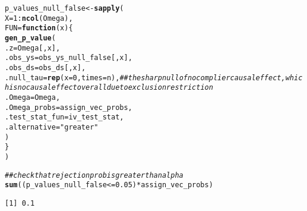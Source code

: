 \documentclass[11pt,leqno]{article}\usepackage[]{graphicx}\usepackage[]{color}
\makeatletter
\newcommand{\hlnum}[1]{\textcolor[rgb]{0.686,0.059,0.569}{#1}}%
\newcommand{\hlstr}[1]{\textcolor[rgb]{0.192,0.494,0.8}{#1}}%
\newcommand{\hlcom}[1]{\textcolor[rgb]{0.678,0.584,0.686}{\textit{#1}}}%
\newcommand{\hlopt}[1]{\textcolor[rgb]{0,0,0}{#1}}%
\newcommand{\hlstd}[1]{\textcolor[rgb]{0.345,0.345,0.345}{#1}}%
\newcommand{\hlkwa}[1]{\textcolor[rgb]{0.161,0.373,0.58}{\textbf{#1}}}%
\newcommand{\hlkwb}[1]{\textcolor[rgb]{0.69,0.353,0.396}{#1}}%
\newcommand{\hlkwc}[1]{\textcolor[rgb]{0.333,0.667,0.333}{#1}}%
\newcommand{\hlkwd}[1]{\textcolor[rgb]{0.737,0.353,0.396}{\textbf{#1}}}%
\newenvironment{kframe}{%
 \def\at@end@of@kframe{}%
 \ifinner\ifhmode%
  \def\at@end@of@kframe{\end{minipage}}%
  \begin{minipage}{\columnwidth}%
 \fi\fi%
 \def\FrameCommand##1{\hskip\@totalleftmargin \hskip-\fboxsep
 \colorbox{shadecolor}{##1}\hskip-\fboxsep
     \hskip-\linewidth \hskip-\@totalleftmargin \hskip\columnwidth}%
 \MakeFramed {\advance\hsize-\width
   \@totalleftmargin\z@ \linewidth\hsize
   \@setminipage}}%
 {\par\unskip\endMakeFramed%
 \at@end@of@kframe}
\newenvironment{knitrout}{}{} %
\theoremstyle{newstyle}
\makeatother
\begin{document}
\begin{knitrout}
\begin{kframe}
\begin{alltt}
\hlstd{p_values_null_false} \hlkwb{<-} \hlkwd{sapply}\hlstd{(}
  \hlkwc{X} \hlstd{=} \hlnum{1}\hlopt{:}\hlkwd{ncol}\hlstd{(Omega),}
  \hlkwc{FUN} \hlstd{=} \hlkwa{function}\hlstd{(}\hlkwc{x}\hlstd{) \{}
    \hlkwd{gen_p_value}\hlstd{(}
      \hlkwc{.z} \hlstd{= Omega[, x],}
      \hlkwc{.obs_ys} \hlstd{= obs_ys_null_false[, x],}
      \hlkwc{.obs_ds} \hlstd{= obs_ds[, x],}
      \hlkwc{.null_tau} \hlstd{=} \hlkwd{rep}\hlstd{(}\hlkwc{x} \hlstd{=} \hlnum{0}\hlstd{,} \hlkwc{times} \hlstd{= n),} \hlcom{## the sharp null of no complier causal effect, which is no causal effect overall due to exclusion restriction}
      \hlkwc{.Omega} \hlstd{= Omega,}
      \hlkwc{.Omega_probs} \hlstd{= assign_vec_probs,}
      \hlkwc{.test_stat_fun} \hlstd{= iv_test_stat,}
      \hlkwc{.alternative} \hlstd{=} \hlstr{"greater"}
    \hlstd{)}
  \hlstd{\}}
\hlstd{)}

\hlcom{## check that rejection prob is greater than alpha}
\hlkwd{sum}\hlstd{((p_values_null_false} \hlopt{<=} \hlnum{0.05}\hlstd{)} \hlopt{*} \hlstd{assign_vec_probs)}
\end{alltt}
\begin{verbatim}
[1] 0.1
\end{verbatim}
\end{kframe}
\end{knitrout}
\end{document}
